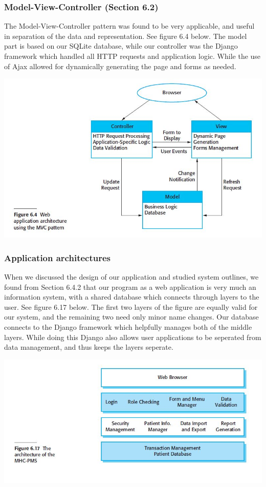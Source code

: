 \documentclass[11pt]{article}
\begin{document}
	\subsubsection{Model-View-Controller (Section 6.2)}
		The Model-View-Controller pattern was found to be very applicable, and useful in separation of the data and representation. 
		See figure 6.4 below. 
		The model part is based on our SQLite database, while our controller was the Django framework which handled all HTTP requests and application logic. 
		While the use of Ajax allowed for dynamically generating the page and forms as needed. \\
		\centerline{\includegraphics[scale=0.5]{./images/MVC}}
	\subsubsection{Application architectures}
		When we discussed the design of our application and studied system outlines, we found from Section 6.4.2 that our program as a web application is very much an information system, with a shared database which connects through layers to the user. 
		See figure 6.17 below. 
		The first two layers of the figure are equally valid for our system, and the remaining two need only minor name changes. 
		Our database connects to the Django framework which helpfully manages both of the middle layers.
		While doing this Django also allows user applications to be seperated from data management, and thus keeps the layers seperate. \\
		\centerline{\includegraphics[scale=0.5]{./images/TPIS}}
\end{document}
